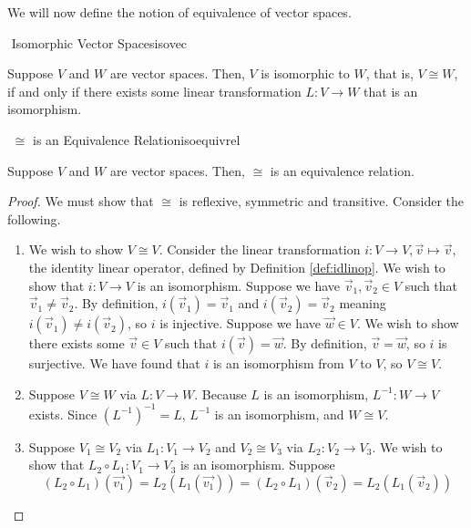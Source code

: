         We will now define the notion of equivalence of vector spaces.
        \begin{definition}{\Stop\,\,Isomorphic Vector Spaces}{isovec}

            Suppose \(V\) and \(W\) are vector spaces. Then, \(V\) is isomorphic to \(W\), that is, \(V\cong W\), if and only if there exists some linear transformation \(L:V\to W\) that is an isomorphism.
            
        \end{definition}
        \begin{theorem}{\Stop\,\,\(\cong\) is an Equivalence Relation}{isoequivrel}

            Suppose \(V\) and \(W\) are vector spaces. Then, \(\cong\) is an equivalence relation.
            \begin{proof}
                We must show that \(\cong\) is reflexive, symmetric and transitive. Consider the following.
                \begin{enumerate}
                    \item We wish to show \(V\cong V\). Consider the linear transformation \(i:V\to V,\vec{v}\mapsto\vec{v}\), the identity linear operator, defined by Definition \ref{def:idlinop}. We wish to show that \(i:V\to V\) is an isomorphism. Suppose we have \(\vec{v}_1,\vec{v}_2\in V\) such that \(\vec{v}_1\neq\vec{v}_2\). By definition, \(i(\vec{v}_1)=\vec{v}_1\) and \(i(\vec{v}_2)=\vec{v}_2\) meaning \(i(\vec{v}_1)\neq i(\vec{v}_2)\), so \(i\) is injective. Suppose we have \(\vec{w}\in V\). We wish to show there exists some \(\vec{v}\in V\) such that \(i(\vec{v})=\vec{w}\). By definition, \(\vec{v}=\vec{w}\), so \(i\) is surjective. We have found that \(i\) is an isomorphism from \(V\) to \(V\), so \(V\cong V\).
                    \item Suppose \(V\cong W\) via \(L:V\to W\). Because \(L\) is an isomorphism, \(L^{-1}:W\to V\) exists. Since \((L^{-1})^{-1}=L\), \(L^{-1}\) is an isomorphism, and \(W\cong V\).
                    \item Suppose \(V_1 \cong V_2\) via \(L_1:V_1\to V_2\) and \(V_2\cong V_3\) via \(L_2:V_2\to V_3\). We wish to show that \(L_2\circ L_1:V_1\to V_3\) is an isomorphism. Suppose
                    \begin{equation*}
                        (L_2\circ L_1)(\vec{v_1})=L_2(L_1(\vec{v_1}))=(L_2\circ L_1)(\vec{v}_2)=L_2(L_1(\vec{v}_2))
                    \end{equation*}

\end{enumerate}
\end{proof}
\end{theorem}
